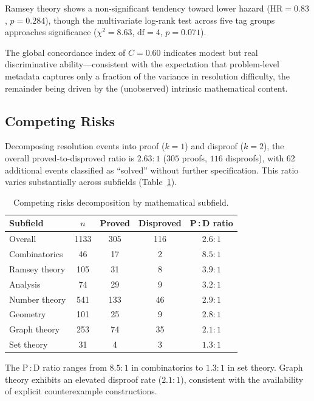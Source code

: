 \documentclass[11pt]{article}
\newcommand{\HR}{\mathrm{HR}}
\begin{document}
Ramsey theory shows a non-significant tendency toward lower hazard
($\HR = 0.83$, $p = 0.284$), though the multivariate log-rank test
across five tag groups approaches significance
($\chi^2 = 8.63$, $\mathrm{df} = 4$, $p = 0.071$).

The global concordance index of $C = 0.60$ indicates modest but
real discriminative ability---consistent with the expectation that
problem-level metadata captures only a fraction of the variance in
resolution difficulty, the remainder being driven by the
(unobserved) intrinsic mathematical content.

\subsection{Competing Risks}

Decomposing resolution events into proof ($k = 1$) and disproof
($k = 2$), the overall proved-to-disproved ratio is $2.63{:}1$
($305$ proofs, $116$ disproofs), with 62 additional events classified
as ``solved'' without further specification. This ratio varies
substantially across subfields (Table~\ref{tab:competing}).

\begin{table}[ht]
\centering
\caption{Competing risks decomposition by mathematical subfield.}
\label{tab:competing}
\begin{tabular}{@{}lcccc@{}}
\toprule
Subfield & $n$ & Proved & Disproved & P\,:\,D ratio \\
\midrule
Overall         & 1133 & 305 & 116 & $2.6{:}1$ \\
Combinatorics   &   46 &  17 &   2 & $8.5{:}1$ \\
Ramsey theory   &  105 &  31 &   8 & $3.9{:}1$ \\
Analysis        &   74 &  29 &   9 & $3.2{:}1$ \\
Number theory   &  541 & 133 &  46 & $2.9{:}1$ \\
Geometry        &  101 &  25 &   9 & $2.8{:}1$ \\
Graph theory    &  253 &  74 &  35 & $2.1{:}1$ \\
Set theory      &   31 &   4 &   3 & $1.3{:}1$ \\
\bottomrule
\end{tabular}
\end{table}

The P\,:\,D ratio ranges from $8.5{:}1$ in combinatorics
to $1.3{:}1$ in set theory. Graph theory exhibits an elevated
disproof rate ($2.1{:}1$), consistent with the availability of
explicit counterexample constructions.
\end{document}
